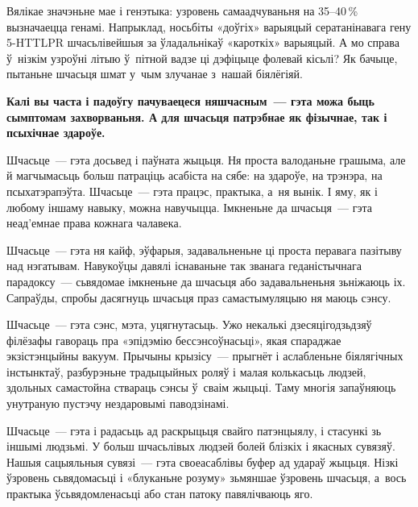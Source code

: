 Вялікае значэньне мае і генэтыка: узровень самаадчуваньня на 35--40\,\% вызначаецца генамі. Напрыклад, носьбіты «доўгіх» варыяцый сератанінавага гену 5-HTTLPR шчасьлівейшыя за ўладальнікаў «кароткіх» варыяцый. А мо справа ў~нізкім узроўні літыю ў~пітной вадзе ці дэфіцыце фолевай кісьлі? Як бачыце, пытаньне шчасьця шмат у~чым злучанае з~нашай біялёгіяй.

\textbf{Калі вы часта і падоўгу пачуваецеся няшчасным~--- гэта можа быць сымптомам захворваньня. А для шчасьця патрэбнае як фізычнае, так і псыхічнае здароўе.}

Шчасьце~--- гэта досьвед і паўната жыцьця. Ня проста валоданьне грашыма, але й магчымасьць больш патраціць асабіста на сябе: на здароўе, на трэнэра, на псыхатэрапэўта. Шчасьце~--- гэта працэс, практыка, а~ня вынік. І яму, як і любому іншаму навыку, можна навучыцца. Імкненьне да шчасьця~--- гэта неад'емнае права кожнага чалавека.


Шчасьце~--- гэта ня кайф, эўфарыя, задавальненьне ці проста перавага пазітыву над нэгатывам. Навукоўцы давялі існаваньне так званага геданістычнага парадоксу~--- сьвядомае імкненьне да шчасьця або задавальненьня зьніжаюць іх. Сапраўды, спробы дасягнуць шчасьця праз самастымуляцыю ня маюць сэнсу.


Шчасьце~--- гэта сэнс, мэта, уцягнутасьць. Ужо некалькі дзесяцігодзьдзяў філёзафы гавораць пра «эпідэмію бессэнсоўнасьці», якая спараджае экзістэнцыйны вакуум. Прычыны крызісу~--- прыгнёт і аслабленьне біялягічных інстынктаў, разбурэньне традыцыйных роляў і малая колькасьць людзей, здольных самастойна ствараць сэнсы ў~сваім жыцьці. Таму многія запаўняюць унутраную пустэчу нездаровымі паводзінамі.

Шчасьце~--- гэта і радасьць ад раскрыцьця свайго патэнцыялу, і стасункі зь іншымі людзьмі. У больш шчасьлівых людзей болей блізкіх і якасных сувязяў. Нашыя сацыяльныя сувязі~--- гэта своеасаблівы буфер ад удараў жыцьця. Нізкі ўзровень сьвядомасьці і «блуканьне розуму» зьмяншае ўзровень шчасьця, а~вось практыка ўсьвядомленасьці або стан патоку павялічваюць яго.

